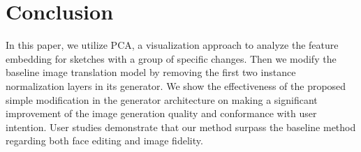 \documentclass[10pt,twocolumn,letterpaper]{article}
\begin{document}
\section{Conclusion}
In this paper, we utilize PCA, a visualization approach to analyze the feature embedding for sketches with a group of specific changes.  
Then we modify the baseline image translation model by removing the first two instance normalization layers in its generator. 
We show the effectiveness of the proposed simple modification in the generator architecture on making a significant improvement of the image generation quality and conformance with user intention. 
User studies demonstrate that our method surpass the baseline method regarding both face editing and image fidelity.    


%
%
%
%
\end{document}
